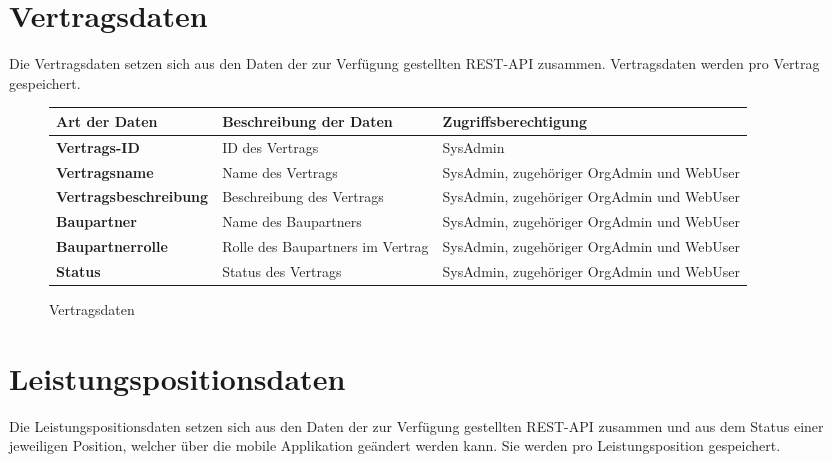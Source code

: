 \section{Vertragsdaten}

Die Vertragsdaten setzen sich aus den Daten der zur Verf\"ugung gestellten REST-API zusammen. Vertragsdaten werden pro Vertrag gespeichert.

\begin{figure}[h]
	\centering
	\begin{tabularx}{\textwidth}{| X || X | X |}
        \hline
		\textbf{Art der Daten} & \textbf{Beschreibung der Daten} & \textbf{Zugriffsberechtigung} \\ \hline \hline
		\textbf{Vertrags-ID} & ID des Vertrags & SysAdmin \\ \hline
		\textbf{Vertragsname} & Name des Vertrags & SysAdmin, zugehöriger OrgAdmin und WebUser \\ \hline
        \textbf{Vertragsbeschreibung} & Beschreibung des Vertrags & SysAdmin, zugehöriger OrgAdmin und WebUser \\ \hline
        \textbf{Baupartner} & Name des Baupartners & SysAdmin, zugehöriger OrgAdmin und WebUser \\ \hline
        \textbf{Baupartnerrolle} & Rolle des Baupartners im Vertrag & SysAdmin, zugehöriger OrgAdmin und WebUser \\ \hline
        \textbf{Status} & Status des Vertrags & SysAdmin, zugehöriger OrgAdmin und WebUser \\ \hline
	\end{tabularx}
	\caption{Vertragsdaten}
	\label{fig:Vertragsdaten}
\end{figure}

\newpage

\section{Leistungspositionsdaten}

Die Leistungspositionsdaten setzen sich aus den Daten der zur Verf\"ugung gestellten REST-API zusammen und aus dem Status einer jeweiligen Position, welcher über die mobile Applikation geändert werden kann.
Sie werden pro Leistungsposition gespeichert.

